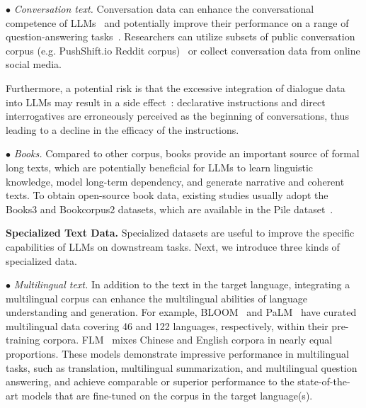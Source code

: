 $\bullet$ \emph{Conversation text.} Conversation data can enhance the conversational competence of LLMs~\cite{Zhang-arxiv-2022-OPT} and potentially improve their performance on a range of question-answering tasks~\cite{Chowdhery-arxiv-2022-PaLM}. Researchers can utilize  subsets of public conversation corpus (e.g. PushShift.io Reddit corpus)~\cite{Roller-ACL-2021-Recipes,Baumgartner-AAAI-2020-The} or collect conversation data from online social media.  

Furthermore, a potential risk is that the excessive integration of dialogue data into LLMs may result in a side effect~\cite{Zhang-arxiv-2022-OPT}:  declarative instructions and direct interrogatives are erroneously perceived as the beginning of conversations, thus leading to a decline in the efficacy of the instructions. 

$\bullet$ \emph{Books.} Compared to other corpus, books provide an important source of  formal long texts, which are potentially   beneficial for {LLMs to learn  linguistic knowledge, model long-term dependency, and generate narrative and coherent texts.} To obtain open-source book data, existing studies usually adopt the Books3 and Bookcorpus2 datasets, which are available in the Pile dataset~\cite{Gao-arxiv-2021-Pile}. 

\textbf{Specialized Text Data.} Specialized  datasets are  useful to improve the specific capabilities of LLMs on downstream tasks. Next, we introduce three kinds of specialized data.

$\bullet$ \emph{Multilingual text.} In addition to the text in the target language, integrating a multilingual corpus can enhance the multilingual abilities of language understanding and generation. For example, BLOOM~\cite{Scao-arxiv-2022-BLOOM} and PaLM~\cite{Chowdhery-arxiv-2022-PaLM} have curated multilingual data covering 46 and 122 languages, respectively, within their pre-training corpora. FLM~\cite{Li-arxiv-2023-FLM} mixes Chinese and English corpora in nearly equal proportions. These models demonstrate impressive performance in multilingual tasks, such as translation, multilingual summarization, and multilingual question answering, and achieve comparable or superior performance to the state-of-the-art models that are fine-tuned on the corpus in the target language(s).

